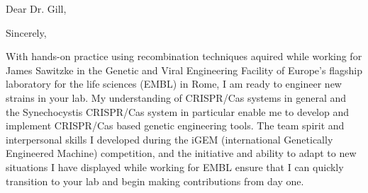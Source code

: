 \documentclass[11pt,a4paper,sans]{moderncv}
\begin{document}
\thispagestyle{titlepage}
\date{\today}
\opening{Dear Dr. Gill,}
\closing{Sincerely,}
\makelettertitle
\begin{spacing}{1.1}

With hands-on practice using recombination techniques aquired while working for James Sawitzke in the Genetic and Viral Engineering Facility of Europe's flagship laboratory for the life sciences (EMBL) in Rome, I am ready to engineer new strains in your lab. %
My understanding of CRISPR/Cas systems in general and the Synechocystis CRISPR/Cas system in particular enable me to develop and implement CRISPR/Cas based genetic engineering tools. %
The team spirit and interpersonal skills I developed during the iGEM (international Genetically Engineered Machine) competition, and the initiative and ability to adapt to new situations I have displayed while working for EMBL ensure that I can quickly transition to your lab and begin making contributions from day one.\par\vspace*{3mm}


\end{spacing}
\end{document}
